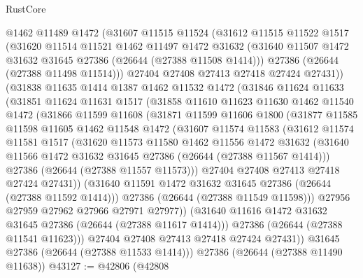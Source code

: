 \begin{lexlean}{RustCore}
\begin{coremodule}
    @1462
    @11489
    @1472
    (@31607
      @11515
      @11524
      (@31612
        @11515
        @11522
        @1517
        (@31620
          @11514
          @11521
          @1462
          @11497
          @1472
          @31632
          (@31640 @11507 @1472 @31632 @31645 @27386 (@26644 (@27388 @11508 @1414)))
          @27386
          (@26644 (@27388 @11498 @11514)))
        @27404
        @27408
        @27413
        @27418
        @27424
        @27431))
    (@31838
      @11635
      @1414
      @1387
      @1462
      @11532
      @1472
      (@31846
        @11624
        @11633
        (@31851
          @11624
          @11631
          @1517
          (@31858
            @11610
            @11623
            @11630
            @1462
            @11540
            @1472
            (@31866
              @11599
              @11608
              (@31871
                @11599
                @11606
                @1800
                (@31877
                  @11585
                  @11598
                  @11605
                  @1462
                  @11548
                  @1472
                  (@31607
                    @11574
                    @11583
                    (@31612
                      @11574
                      @11581
                      @1517
                      (@31620
                        @11573
                        @11580
                        @1462
                        @11556
                        @1472
                        @31632
                        (@31640 @11566 @1472 @31632 @31645 @27386 (@26644 (@27388 @11567 @1414)))
                        @27386
                        (@26644 (@27388 @11557 @11573)))
                      @27404
                      @27408
                      @27413
                      @27418
                      @27424
                      @27431))
                  (@31640 @11591 @1472 @31632 @31645 @27386 (@26644 (@27388 @11592 @1414)))
                  @27386
                  (@26644 (@27388 @11549 @11598)))
                @27956
                @27959
                @27962
                @27966
                @27971
                @27977))
            (@31640 @11616 @1472 @31632 @31645 @27386 (@26644 (@27388 @11617 @1414)))
            @27386
            (@26644 (@27388 @11541 @11623)))
          @27404
          @27408
          @27413
          @27418
          @27424
          @27431))
      @31645
      @27386
      (@26644 (@27388 @11533 @1414)))
    @27386
    (@26644 (@27388 @11490 @11638))
@43127 := @42806
    (@42808

\end{coremodule}
\end{lexlean}
